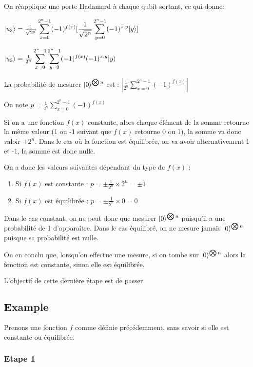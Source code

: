 \documentclass[12pt,a4paper]{article}
\DeclarePairedDelimiter\ket{\lvert}{\rangle}
\begin{document}
On réapplique une porte Hadamard à chaque qubit sortant, ce qui donne:

$\ket{u_3} = \frac{1}{\sqrt{2^{n}}}
\displaystyle\sum_{x=0}^{2^n-1} (-1)^{f(x)} [\frac{1}{\sqrt{2^{n}}} \displaystyle\sum_{y=0}^{2^n-1} (-1)^{x.y}\ket{y} ]$

$\ket{u_3} = \frac{1}{2^{n}}
\displaystyle\sum_{x=0}^{2^n-1} \displaystyle\sum_{y=0}^{2^n-1}(-1)^{f(x)} (-1)^{x.y}\ket{y}$

La probabilité de mesurer $\ket{0}^{\bigotimes n}$ est : 
$|\frac{1}{2^{n}}\displaystyle\sum_{x=0}^{2^n-1}(-1)^{f(x)}|$

On note $p = \frac{1}{2^{n}}\displaystyle\sum_{x=0}^{2^n-1}(-1)^{f(x)}$

Si on a une fonction $f(x)$ constante, alors chaque élément de la somme retourne la même valeur (1 ou -1 suivant que $f(x)$ retourne 0 ou 1), la somme va donc valoir $\pm 2^{n}$. Dans le cas où la fonction est équilibrée, on va avoir alternativement 1 et -1, la somme est donc nulle.

On a donc les valeurs suivantes dépendant du type de $f(x)$ :
\begin{enumerate}
  \item Si $f(x)$ est constante :  $p = \pm \frac{1}{2^n} \times 2^{n} = \pm 1$
  \item Si $f(x)$ est équilibrée : $p = \pm \frac{1}{2^n} \times 0 = 0$
\end{enumerate}

Dans le cas constant, on ne peut donc que mesurer $\ket{0}^{\bigotimes n}$ puisqu'il a une probabilité de 1 d'apparaître. Dans le cas équilibré, on ne mesure jamais $\ket{0}^{\bigotimes n}$ puisque sa probabilité est nulle.

On en conclu que, lorsqu'on effectue une mesure, si on tombe sur $\ket{0}^{\bigotimes n}$ alors la fonction est constante, sinon elle est équilibrée.

L'objectif de cette dernière étape est de passer 

\subsection{Example}

Prenons une fonction $f$ comme définie précédemment, sans savoir si elle est constante ou équilibrée.

\subsubsection{Etape 1}
\end{document}
